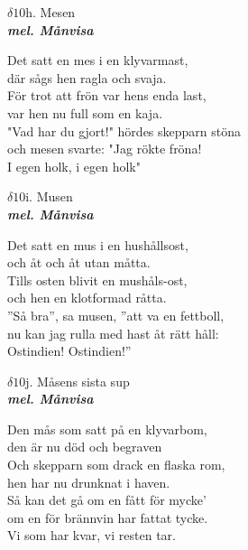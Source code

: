 \documentclass[a6paper,10pt]{article}
\newcommand{\mel}[1]{\small\textbf{\textit{mel. #1 \\}}}
\begin{document}
\newpage
\setlength{\oddsidemargin}{-0.37in}
\noindent
\begin{center}
\Large $\delta10$h. Mesen\\ 
\mel{Månvisa}
\end{center}
Det satt en mes i en klyvarmast,\\
där sågs hen ragla och svaja.\\
För trot att frön var hens enda last,\\
var hen nu full som en kaja.\\
"Vad har du gjort!" hördes skepparn stöna\\
och mesen svarte: "Jag rökte fröna!\\
I egen holk, i egen holk"
\begin{center}
\Large $\delta10$i. Musen\\ 
\mel{Månvisa}
\end{center}
Det satt en mus i en hushållsost,\\
och åt och åt utan måtta.\\
Tills osten blivit en mushåls-ost,\\
och hen en klotformad råtta.\\
”Så bra”, sa musen, ”att va en fettboll,\\
nu kan jag rulla med hast åt rätt håll:\\
Ostindien! Ostindien!”
\begin{center}
\Large $\delta10$j. Måsens sista sup\\ 
\mel{Månvisa}
\end{center}
Den mås som satt på en klyvarbom,\\
den är nu död och begraven\\
Och skepparn som drack en flaska rom,\\
hen har nu drunknat i haven.\\
Så kan det gå om en fått för mycke'\\
om en för brännvin har fattat tycke.\\
Vi som har kvar, vi resten tar.
\end{document}
